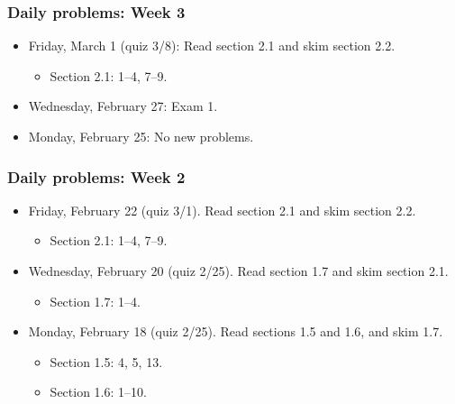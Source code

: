 \subsubsection{Daily problems: Week 3}
\label{dailyproblems:week3}

\begin{itemize}
\item Friday, March 1 (quiz 3\slash 8): Read section 2.1 and skim section 2.2.

\begin{itemize}
\item Section 2.1: 1--4, 7--9.

\end{itemize}

\item Wednesday, February 27: Exam 1.

\item Monday, February 25: No new problems.

\end{itemize}

\subsubsection{Daily problems: Week 2}
\label{dailyproblems:week2}

\begin{itemize}
\item Friday, February 22 (quiz 3\slash 1). Read section 2.1 and skim section 2.2.

\begin{itemize}
\item Section 2.1: 1--4, 7--9.

\end{itemize}

\item Wednesday, February 20 (quiz 2\slash 25). Read section 1.7 and skim section 2.1.

\begin{itemize}
\item Section 1.7: 1--4.

\end{itemize}

\item Monday, February 18 (quiz 2\slash 25). Read sections 1.5 and 1.6, and skim 1.7.

\begin{itemize}
\item Section 1.5: 4, 5, 13.

\item Section 1.6: 1--10.

\end{itemize}

\end{itemize}

